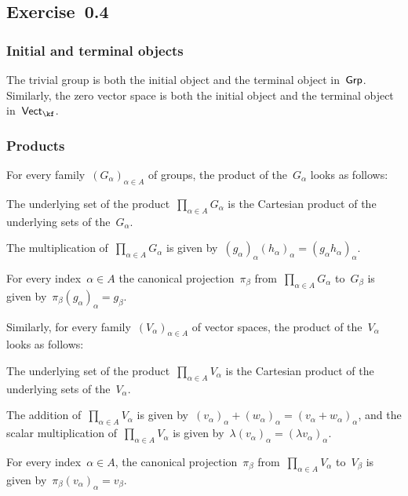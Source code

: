 \subsection{Exercise~0.4}



\subsubsection{Initial and terminal objects}

The trivial group is both the initial object and the terminal object in~$\mathsf{Grp}$.
Similarly, the zero vector space is both the initial object and the terminal object in~$\Vectk$.



\subsubsection{Products}

For every family~$(G_α)_{α ∈ A}$ of groups, the product of the~$G_α$ looks as follows:
\begin{itemize*}

	\item
		The underlying set of the product~$∏_{α ∈ A} G_α$ is the Cartesian product of the underlying sets of the~$G_α$.

	\item
		The multiplication of~$∏_{α ∈ A} G_α$ is given by~$(g_α)_α (h_α)_α = (g_α h_α)_α$.

	\item
		For every index~$α ∈ A$ the canonical projection~$π_β$ from~$∏_{α ∈ A} G_α$ to~$G_β$ is given by~$π_β (g_α)_α  = g_β$.

\end{itemize*}
Similarly, for every family~$(V_α)_{α ∈ A}$ of vector spaces, the product of the~$V_α$ looks as follows:
\begin{itemize*}

	\item
		The underlying set of the product~$∏_{α ∈ A} V_α$ is the Cartesian product of the underlying sets of the~$V_α$.

	\item
		The addition of~$∏_{α ∈ A} V_α$ is given by~$(v_α)_α + (w_α)_α =(v_α + w_α)_α$, and the scalar multiplication of~$∏_{α ∈ A} V_α$ is given by~$λ (v_α)_α = (λ v_α)_α$.

	\item
		For every index~$α ∈ A$, the canonical projection~$π_β$ from~$∏_{α ∈ A} V_α$ to~$V_β$ is given by~$π_β (v_α)_α  = v_β$.

\end{itemize*}



